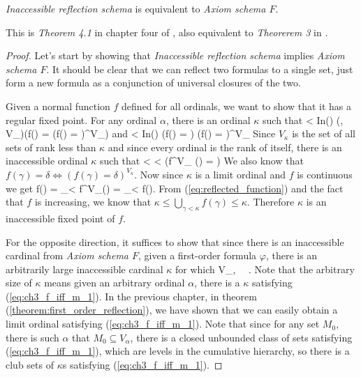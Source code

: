 \begin{theorem}
\emph{Inaccessible reflection schema} is equivalent to \emph{Axiom schema $F$}.
\end{theorem}

This is \emph{Theorem 4.1} in chapter four of \cite{DrakeBook}, also equivalent to \emph{Theorerem 3} in \cite{Levy60a}.
\begin{proof}
Let's start by showing that \emph{Inaccessible reflection schema} implies \emph{Axiom schema $F$}. 
It should be clear that we can reflect two formulas to a single set, just form a new formula as a conjunction of universal closures of the two.

Given a normal function $f$ defined for all ordinals, we want to show that it has a regular fixed point. 
For any ordinal $\alpha$, there is an ordinal $\kappa$ such that 
\beq
\alpha < \kappa \et In(\kappa) \et (\forall \gamma, \delta \in V_\kappa)(f(\gamma) = \delta \iff (f(\gamma) = \delta)^{V_\kappa})
\eeq
and
\beq
\alpha < \kappa \et In(\kappa) \et \forall \gamma \exists \delta (f(\gamma) = \delta) \iff (\forall \gamma \exists \delta f(\gamma) = \delta)^{V_\kappa}
\eeq
Since $V_\kappa$ is the set of all sets of rank less than $\kappa$ and since every ordinal is the rank of itself, there is an inaccessible ordinal $\kappa$ such that
\beq
\forall \gamma < \kappa \exists \delta < \kappa (f^{V_\kappa} (\gamma) = \delta)\label{eq:reflected_function}
\eeq
We also know that $f(\gamma) = \delta \iff (f(\gamma) = \delta)^{V_\kappa}$. 
Now since $\kappa$ is a limit ordinal and $f$ is continuous we get
\beq
f(\kappa) = \bigcup_{\gamma < \kappa} f^{V_\kappa}(\gamma) = \bigcup_{\gamma < \kappa} f(\gamma)\mbox{.}
\eeq
From (\ref{eq:reflected_function}) and the fact that $f$ is increasing, we know that $\kappa \leq \bigcup_{\gamma < \kappa} f(\gamma) \leq \kappa$. Therefore $\kappa$ is an inaccessible fixed point of $f$.

For the opposite direction, it suffices to show that since there is an inaccessible cardinal from \emph{Axiom schema $F$}, given a first-order formula $\varphi$, there is an arbitrarily large inaccessible cardinal $\kappa$ for which 
\beq
\varphi \iff \langle V_\kappa, \in \rangle~\models~\varphi\mbox{.}\label{eq:ch3_f_iff_m_1}
\eeq
Note that the arbitrary size of $\kappa$ means given an arbitrary ordinal $\alpha$, there is a $\kappa$ satisfying (\ref{eq:ch3_f_iff_m_1}).
In the previous chapter, in theorem (\ref{theorem:first_order_reflection}), we have shown that we can easily obtain a limit ordinal satisfying (\ref{eq:ch3_f_iff_m_1}). Note that since for any set $M_0$, there is such $\alpha$ that $M_0 \subseteq V_\alpha$, there is a closed unbounded class of sets satisfying (\ref{eq:ch3_f_iff_m_1}), which are levels in the cumulative hierarchy, so there is a club sets of $\kappa$s satisfying (\ref{eq:ch3_f_iff_m_1}).


\end{proof}
